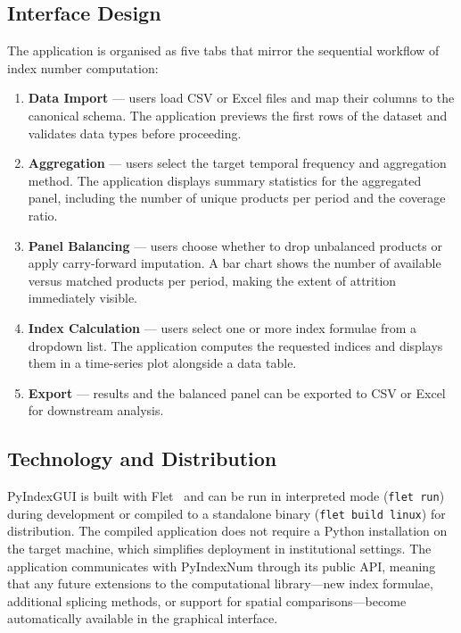 \documentclass[12pt,a4paper]{article}
\begin{document}
\subsection{Interface Design}

The application is organised as five tabs that mirror the sequential workflow of index number computation:

\begin{enumerate}[nosep]
  \item \textbf{Data Import} --- users load CSV or Excel files and map their columns to the canonical schema. The application previews the first rows of the dataset and validates data types before proceeding.
  \item \textbf{Aggregation} --- users select the target temporal frequency and aggregation method. The application displays summary statistics for the aggregated panel, including the number of unique products per period and the coverage ratio.
  \item \textbf{Panel Balancing} --- users choose whether to drop unbalanced products or apply carry-forward imputation. A bar chart shows the number of available versus matched products per period, making the extent of attrition immediately visible.
  \item \textbf{Index Calculation} --- users select one or more index formulae from a dropdown list. The application computes the requested indices and displays them in a time-series plot alongside a data table.
  \item \textbf{Export} --- results and the balanced panel can be exported to CSV or Excel for downstream analysis.
\end{enumerate}

\subsection{Technology and Distribution}

PyIndexGUI is built with Flet~\autocite{flet2024framework} and can be run in interpreted mode (\texttt{flet run}) during development or compiled to a standalone binary (\texttt{flet build linux}) for distribution. The compiled application does not require a Python installation on the target machine, which simplifies deployment in institutional settings. The application communicates with PyIndexNum through its public API, meaning that any future extensions to the computational library---new index formulae, additional splicing methods, or support for spatial comparisons---become automatically available in the graphical interface.
\end{document}
